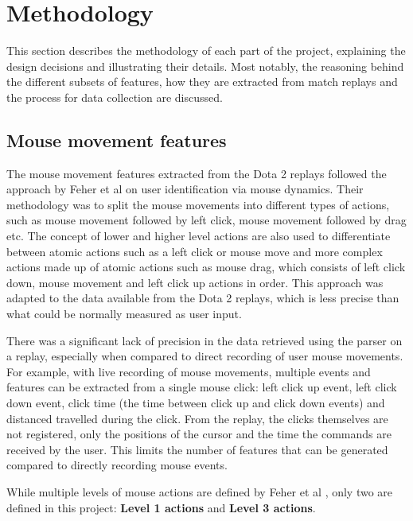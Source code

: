 \documentclass[Report.tex]{subfiles}
\begin{document}
\section{Methodology}\label{sec:methodology}
This section describes the methodology of each part of the project, explaining the design decisions and illustrating their details. Most notably, the reasoning behind the different subsets of features, how they are extracted from match replays and the process for data collection are discussed.

\subsection{Mouse movement features}\label{sec:mm-features}
The mouse movement features extracted from the Dota 2 replays followed the approach by Feher et al \cite{mouse-dynamics} on user identification via mouse dynamics. Their methodology was to split the mouse movements into different types of actions, such as mouse movement followed by left click, mouse movement followed by drag etc. The concept of lower and higher level actions are also used to differentiate between atomic actions such as a left click or mouse move and more complex actions made up of atomic actions such as mouse drag, which consists of left click down, mouse movement and left click up actions in order. This approach was adapted to the data available from the Dota 2 replays, which is less precise than what could be normally measured as user input. 

There was a significant lack of precision in the data retrieved using the parser on a replay, especially when compared to direct recording of user mouse movements. For example, with live recording of mouse movements, multiple events and features can be extracted from a single mouse click: left click up event, left click down event, click time (the time between click up and click down events) and distanced travelled during the click. From the replay, the clicks themselves are not registered, only the positions of the cursor and the time the commands are received by the user. This limits the number of features that can be generated compared to directly recording mouse events.

While multiple levels of mouse actions are defined by Feher et al \cite{mouse-dynamics}, only two are defined in this project: \textbf{Level 1 actions} and \textbf{Level 3 actions}.
\end{document}

